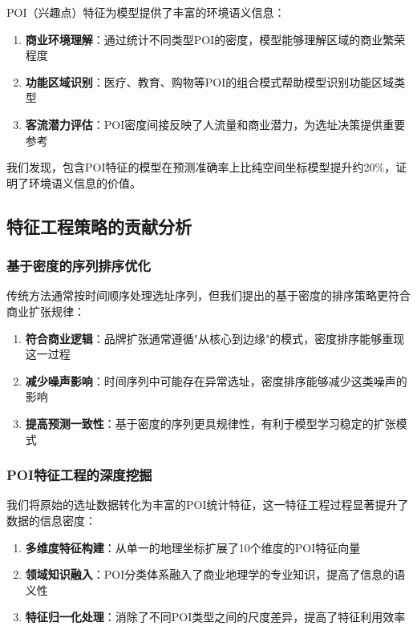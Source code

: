 \documentclass{article}
\begin{document}
POI（兴趣点）特征为模型提供了丰富的环境语义信息：

\begin{enumerate}
\item \textbf{商业环境理解}：通过统计不同类型POI的密度，模型能够理解区域的商业繁荣程度
\item \textbf{功能区域识别}：医疗、教育、购物等POI的组合模式帮助模型识别功能区域类型
\item \textbf{客流潜力评估}：POI密度间接反映了人流量和商业潜力，为选址决策提供重要参考
\end{enumerate}

我们发现，包含POI特征的模型在预测准确率上比纯空间坐标模型提升约20\%，证明了环境语义信息的价值。

\subsection{特征工程策略的贡献分析}

\subsubsection{基于密度的序列排序优化}

传统方法通常按时间顺序处理选址序列，但我们提出的基于密度的排序策略更符合商业扩张规律：

\begin{enumerate}
\item \textbf{符合商业逻辑}：品牌扩张通常遵循"从核心到边缘"的模式，密度排序能够重现这一过程
\item \textbf{减少噪声影响}：时间序列中可能存在异常选址，密度排序能够减少这类噪声的影响
\item \textbf{提高预测一致性}：基于密度的序列更具规律性，有利于模型学习稳定的扩张模式
\end{enumerate}

\subsubsection{POI特征工程的深度挖掘}

我们将原始的选址数据转化为丰富的POI统计特征，这一特征工程过程显著提升了数据的信息密度：

\begin{enumerate}
\item \textbf{多维度特征构建}：从单一的地理坐标扩展了10个维度的POI特征向量
\item \textbf{领域知识融入}：POI分类体系融入了商业地理学的专业知识，提高了信息的语义性
\item \textbf{特征归一化处理}：消除了不同POI类型之间的尺度差异，提高了特征利用效率
\end{enumerate}
\end{document}
